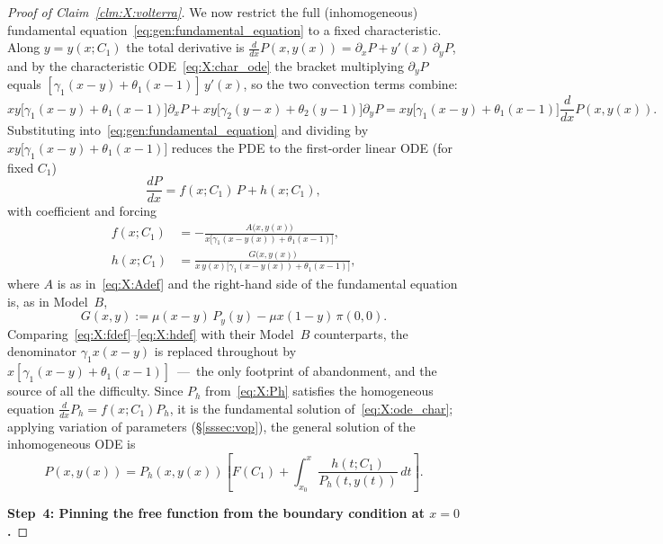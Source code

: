 \begin{proof}[Proof of Claim~\ref{clm:X:volterra}]
We now restrict the full (inhomogeneous) fundamental
equation~\eqref{eq:gen:fundamental_equation} to a fixed characteristic. Along
$y=y(x;C_1)$ the total derivative is
$\frac{d}{dx}P(x,y(x))=\partial_x P + y'(x)\,\partial_y P$, and by the characteristic
ODE~\eqref{eq:X:char_ode} the bracket multiplying $\partial_y P$ equals
$[\gamma_1(x-y)+\theta_1(x-1)]\,y'(x)$, so the two convection terms combine:
\[
    xy\bigl[\gamma_1(x-y)+\theta_1(x-1)\bigr]\partial_x P
    + xy\bigl[\gamma_2(y-x)+\theta_2(y-1)\bigr]\partial_y P
    = xy\bigl[\gamma_1(x-y)+\theta_1(x-1)\bigr]\frac{d}{dx}P(x,y(x)).
\]
Substituting into~\eqref{eq:gen:fundamental_equation} and dividing by
$xy\bigl[\gamma_1(x-y)+\theta_1(x-1)\bigr]$ reduces the PDE to the first-order linear ODE
(for fixed $C_1$)
\begin{equation}
    \frac{dP}{dx} = f(x;C_1)\,P + h(x;C_1),
    \label{eq:X:ode_char}
\end{equation}
with coefficient and forcing
\begin{align}
    f(x;C_1) &= -\frac{A\bigl(x,y(x)\bigr)}
                       {x\bigl[\gamma_1(x-y(x))+\theta_1(x-1)\bigr]},
    \label{eq:X:fdef}\\[4pt]
    h(x;C_1) &= \frac{G\bigl(x,y(x)\bigr)}
                     {x\,y(x)\bigl[\gamma_1(x-y(x))+\theta_1(x-1)\bigr]},
    \label{eq:X:hdef}
\end{align}
where $A$ is as in~\eqref{eq:X:Adef} and the right-hand side of the fundamental equation
is, as in Model~$B$,
\begin{equation}
    G(x,y) := \mu(x-y)\,P_y(y) - \mu x(1-y)\,\pi(0,0).
    \label{eq:X:Gdef}
\end{equation}
Comparing~\eqref{eq:X:fdef}--\eqref{eq:X:hdef} with their Model~$B$ counterparts, the
denominator $\gamma_1 x(x-y)$ is replaced throughout by
$x[\gamma_1(x-y)+\theta_1(x-1)]$~---~the only footprint of abandonment, and the source of
all the difficulty. Since $P_h$ from~\eqref{eq:X:Ph} satisfies the homogeneous equation
$\frac{d}{dx}P_h=f(x;C_1)P_h$, it is the fundamental solution
of~\eqref{eq:X:ode_char}; applying variation of parameters (\S\ref{sssec:vop}), the
general solution of the inhomogeneous ODE is
\begin{equation}
    P(x,y(x)) = P_h(x,y(x))\!\left[F(C_1)
        + \int_{x_0}^{x} \frac{h(t;C_1)}{P_h(t,y(t))}\,dt\right].
    \label{eq:X:variation}
\end{equation}

\medskip\noindent\textbf{Step~4: Pinning the free function from the boundary condition at $x=0$.}


\end{proof}
